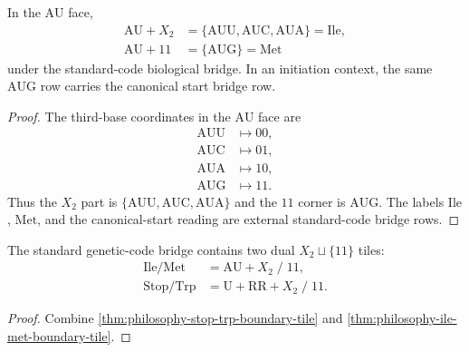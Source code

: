 \begin{theorem}
\label{thm:philosophy-ile-met-boundary-tile}
In the $\mathrm{AU}$ face,
$$
\begin{aligned}
  \mathrm{AU}+X_{2}
    &=\{\mathrm{AUU},\mathrm{AUC},\mathrm{AUA}\}
      =\mathrm{Ile},\\
  \mathrm{AU}+11
    &=\{\mathrm{AUG}\}
      =\mathrm{Met}
\end{aligned}
$$
under the standard-code biological bridge. In an initiation context, the
same $\mathrm{AUG}$ row carries the canonical start bridge row.
\end{theorem}
\begin{proof}
The third-base coordinates in the $\mathrm{AU}$ face are
$$
\begin{aligned}
  \mathrm{AUU} &\longmapsto 00,\\
  \mathrm{AUC} &\longmapsto 01,\\
  \mathrm{AUA} &\longmapsto 10,\\
  \mathrm{AUG} &\longmapsto 11.
\end{aligned}
$$
Thus the $X_{2}$ part is
$\{\mathrm{AUU},\mathrm{AUC},\mathrm{AUA}\}$ and the $11$ corner is
$\mathrm{AUG}$. The labels $\mathrm{Ile}$, $\mathrm{Met}$, and the
canonical-start reading are external standard-code bridge rows.
\end{proof}

\begin{corollary}
\label{cor:philosophy-dual-boundary-tiles}
The standard genetic-code bridge contains two dual
$X_{2}\sqcup\{11\}$ tiles:
$$
\begin{aligned}
  \mathrm{Ile}/\mathrm{Met}
    &=
      \mathrm{AU}+X_{2}\;/\;11,\\
  \mathrm{Stop}/\mathrm{Trp}
    &=
      \mathrm{U}+\mathrm{RR}+X_{2}\;/\;11.
\end{aligned}
$$
\end{corollary}
\begin{proof}
Combine \autoref{thm:philosophy-stop-trp-boundary-tile} and
\autoref{thm:philosophy-ile-met-boundary-tile}.
\end{proof}


